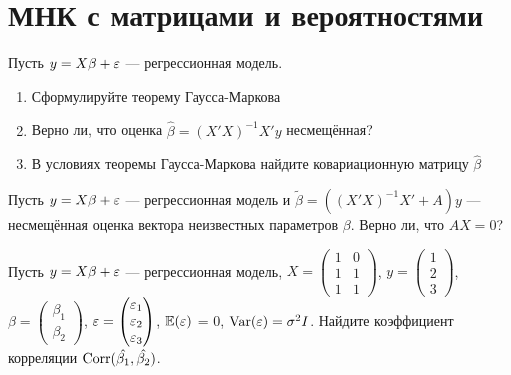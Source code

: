 \documentclass[pdftex,11pt,openany]{book}\usepackage[]{graphicx}\usepackage[]{color}
\begin{document}
\begin{solution}
\end{solution}


\chapter{МНК с матрицами и вероятностями}


\begin{problem} 
Пусть $y = X\beta + \varepsilon$ --- регрессионная модель.
\begin{enumerate}
\item Сформулируйте теорему Гаусса-Маркова
\item Верно ли, что оценка $\hat{\beta} = (X'X)^{-1}X'y$ несмещённая?
\item В условиях теоремы Гаусса-Маркова найдите ковариационную матрицу $\hat{\beta}$
\end{enumerate}
\end{problem}

\begin{solution}
\end{solution}

\begin{problem} 
Пусть $y = X\beta + \varepsilon$ --- регрессионная модель и $\tilde{\beta} = ((X'X)^{-1}X'+ A)y$ --- несмещённая оценка вектора неизвестных параметров $\beta$. Верно ли, что $AX=0$?
\end{problem}

\begin{solution}
\end{solution}




\begin{problem}
 Пусть $y = X\beta + \varepsilon$ --- регрессионная модель, $X = \begin{pmatrix} 1 & 0 \\ 1 & 1 \\ 1 & 1 \end{pmatrix}$, $y = \begin{pmatrix} 1 \\ 2 \\ 3 \end{pmatrix}$, $\beta = \begin{pmatrix} \beta_1 \\ \beta_2 \end{pmatrix}$, $\varepsilon = \begin{pmatrix} \varepsilon_1 \\ \varepsilon_2 \\ \varepsilon_3 \end{pmatrix}$, $\mathbb{E}(\varepsilon)$ = 0, $\operatorname{Var}(\varepsilon) = \sigma^2 I$. Найдите коэффициент корреляции $\operatorname{Corr}(\hat{\beta_1},\hat{\beta_2})$.


\end{problem}
\end{document}
